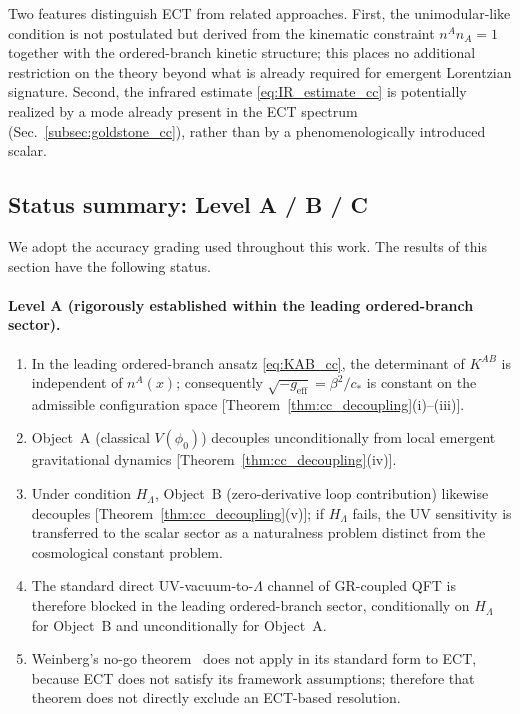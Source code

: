 Two features distinguish ECT from related approaches. First, the
unimodular-like condition is not postulated but derived from the
kinematic constraint $n^A n_A = 1$ together with the ordered-branch
kinetic structure; this places no additional restriction on the
theory beyond what is already required for emergent Lorentzian
signature. Second, the infrared estimate \eqref{eq:IR_estimate_cc} is
potentially realized by a mode already present in the ECT spectrum
(Sec.~\ref{subsec:goldstone_cc}), rather than by a phenomenologically
introduced scalar.


\subsection{Status summary: Level A / B / C}
\label{subsec:levels_cc}

We adopt the accuracy grading used throughout this work. The results
of this section have the following status.

\paragraph{Level A (rigorously established within the leading
ordered-branch sector).}
\begin{enumerate}
\item In the leading ordered-branch ansatz \eqref{eq:KAB_cc}, the
determinant of $K^{AB}$ is independent of $n^A(x)$; consequently
$\sqrt{-g_{\mathrm{eff}}} = \beta^2/c_*$ is constant on the
admissible configuration space [Theorem~\ref{thm:cc_decoupling}(i)--(iii)].
\item Object~A (classical $V(\phi_0)$) decouples unconditionally from
local emergent gravitational dynamics [Theorem~\ref{thm:cc_decoupling}(iv)].
\item Under condition $H_\Lambda$, Object~B (zero-derivative loop
contribution) likewise decouples [Theorem~\ref{thm:cc_decoupling}(v)]; if $H_\Lambda$ fails, the UV
sensitivity is transferred to the scalar sector as a naturalness
problem distinct from the cosmological constant problem.
\item The standard direct UV-vacuum-to-$\Lambda$ channel of
GR-coupled QFT is therefore blocked in the leading ordered-branch
sector, conditionally on $H_\Lambda$ for Object~B and unconditionally for
Object~A.
\item Weinberg's no-go theorem~\cite{Weinberg1989} does not apply in
its standard form to ECT, because ECT does not satisfy its framework
assumptions; therefore that theorem does not directly exclude an
ECT-based resolution.
\end{enumerate}

